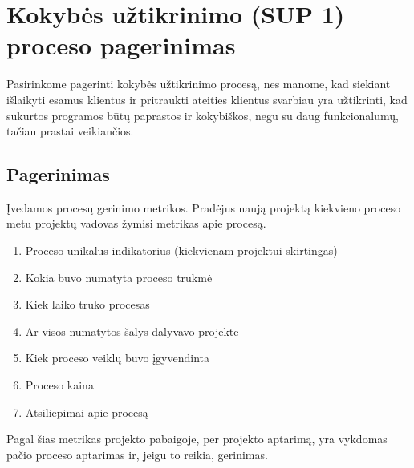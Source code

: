 \documentclass{VUMIFPSkursinis}
\begin{document}
\section{Kokybės užtikrinimo (SUP 1) proceso pagerinimas}
	Pasirinkome pagerinti kokybės užtikrinimo procesą, nes manome, kad siekiant išlaikyti esamus klientus ir pritraukti ateities klientus svarbiau yra užtikrinti, 
	kad sukurtos programos būtų paprastos ir kokybiškos, negu su daug funkcionalumų, tačiau prastai veikiančios.

			\subsection{Pagerinimas}
				Įvedamos procesų gerinimo metrikos.
				Pradėjus naują projektą kiekvieno proceso metu projektų vadovas žymisi metrikas apie procesą.
					\begin{enumerate}
						\item{Proceso unikalus indikatorius (kiekvienam projektui skirtingas)}
						\item{Kokia buvo numatyta proceso trukmė}
						\item{Kiek laiko truko procesas}
						\item{Ar visos numatytos šalys dalyvavo projekte}
						\item{Kiek proceso veiklų buvo įgyvendinta}
						\item{Proceso kaina}
						\item{Atsiliepimai apie procesą}
					\end{enumerate}
				Pagal šias metrikas projekto pabaigoje, per projekto aptarimą, yra vykdomas pačio proceso aptarimas ir, jeigu to reikia, gerinimas.
\end{document}
